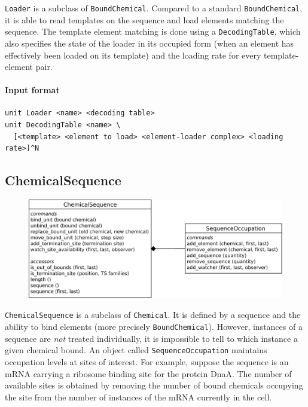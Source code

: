 \documentclass[12pt]{article}
\theoremstyle{definition}
\theoremstyle{remark}
\numberwithin{equation}{section}
\begin{document}
\texttt{Loader} is a subclass of \texttt{BoundChemical}. Compared to a standard \texttt{BoundChemical}, it is able to read templates on the sequence and load elements matching the sequence. The template element matching is done using a \texttt{DecodingTable}, which also specifies the state of the loader in its occupied form (when an element has effectively been loaded on its template) and the loading rate for every template-element pair.

\paragraph{Input format}
\begin{verbatim}
unit Loader <name> <decoding table>
unit DecodingTable <name> \
  [<template> <element to load> <element-loader complex> <loading rate>]^N
\end{verbatim}


\subsection{ChemicalSequence}

\begin{figure}[!ht]
	\centering
	\includegraphics[scale=0.8]{chemicalsequence}
\end{figure}

\texttt{ChemicalSequence} is a subclass of \texttt{Chemical}. It is defined by a sequence and the ability to bind elements (more precisely \texttt{BoundChemical}). However, instances of a sequence are \emph{not} treated individually, it is impossible to tell to which instance a given chemical bound. An object called \texttt{SequenceOccupation} maintains occupation levels at sites of interest. For example, suppose the sequence is an mRNA carrying a ribosome binding site for the protein DnaA. The number of available sites is obtained by removing the number of bound chemicals occupying the site from the number of instances of the mRNA currently in the cell.
\end{document}
